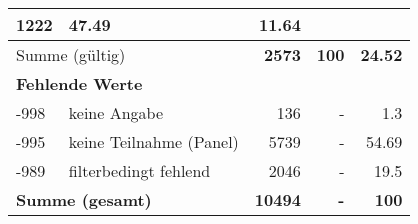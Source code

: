 \begin{longtable}{lXrrr}
       \num{1222} &
       \num[round-mode=places,round-precision=2]{47,49} &
         \num[round-mode=places,round-precision=2]{11,64} \\
     \midrule
     \multicolumn{2}{l}{Summe (gültig)} &
       \textbf{\num{2573}} &
     \textbf{100} &
       \textbf{\num[round-mode=places,round-precision=2]{24,52}} \\
     \multicolumn{5}{l}{\textbf{Fehlende Werte}}\\
       -998 &
       keine Angabe &
         \num{136} &
        - &
         \num[round-mode=places,round-precision=2]{1,3} \\
       -995 &
       keine Teilnahme (Panel) &
         \num{5739} &
        - &
         \num[round-mode=places,round-precision=2]{54,69} \\
       -989 &
       filterbedingt fehlend &
         \num{2046} &
        - &
         \num[round-mode=places,round-precision=2]{19,5} \\
     \midrule
     \multicolumn{2}{l}{\textbf{Summe (gesamt)}} &
          \textbf{\num{10494}} &
        \textbf{-} &
        \textbf{100} \\
     \bottomrule
     \end{longtable}
     
